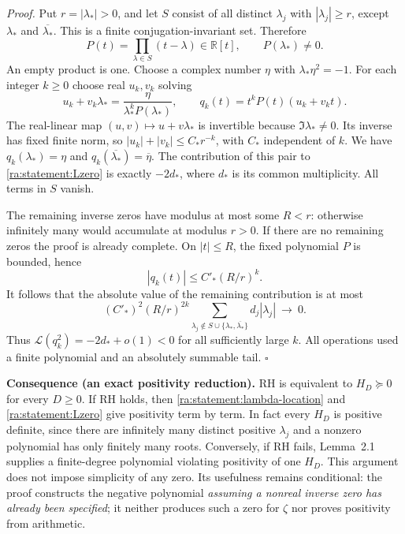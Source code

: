 \documentclass[11pt]{article}
\newcommand{\R}{\mathbb{R}}
\begin{document}
\textit{Proof.}
Put $r=|\lambda_*|>0$, and let $S$ consist of all distinct $\lambda_j$
with $|\lambda_j|\ge r$, except $\lambda_*$ and $\overline{\lambda_*}$.
This is a finite conjugation-invariant set. Therefore
\[
 P(t)=\prod_{\lambda\in S}(t-\lambda)\in\R[t],
 \qquad P(\lambda_*)\ne0.
\]
An empty product is one. Choose a complex number $\eta$ with
$\lambda_*\eta^2=-1$. For each integer $k\ge0$ choose real $u_k,v_k$ solving
\[
 u_k+v_k\lambda_*
       =\frac{\eta}{\lambda_*^kP(\lambda_*)},
 \qquad q_k(t)=t^kP(t)(u_k+v_kt).
\]
The real-linear map $(u,v)\mapsto u+v\lambda_*$ is invertible because
$\Im\lambda_*\ne0$. Its inverse has fixed finite norm, so
$|u_k|+|v_k|\le C_*r^{-k}$, with $C_*$ independent of $k$.
We have $q_k(\lambda_*)=\eta$ and
$q_k(\overline{\lambda_*})=\overline\eta$. The contribution of this pair
to \eqref{ra:statement:Lzero} is exactly $-2d_*$, where $d_*$ is its common
multiplicity. All terms in $S$ vanish.

The remaining inverse zeros have modulus at most some $R<r$: otherwise
infinitely many would accumulate at modulus $r>0$. If there are no remaining
zeros the proof is already complete. On $|t|\le R$, the fixed polynomial
$P$ is bounded, hence
\[
 |q_k(t)|\le C'_* (R/r)^k.
\]
It follows that the absolute value of the remaining contribution is at most
\begin{equation}\label{ra:statement:filter-tail}
 (C'_*)^2(R/r)^{2k}\sum_{\lambda_j\notin S\cup\{\lambda_*,\overline{\lambda_*}\}}
                  d_j|\lambda_j|\ \longrightarrow\ 0.
\end{equation}
Thus $\mathcal L(q_k^2)=-2d_*+o(1)<0$ for all sufficiently large $k$.
All operations used a finite polynomial and an absolutely summable tail.
\hfill$\square$

\medskip
\textbf{Consequence (an exact positivity reduction).}
RH is equivalent to $H_D\succeq0$ for every $D\ge0$. If RH holds, then
\eqref{ra:statement:lambda-location} and \eqref{ra:statement:Lzero} give positivity
term by term. In fact every $H_D$ is positive definite, since there are
infinitely many distinct positive $\lambda_j$ and a nonzero polynomial has
only finitely many roots. Conversely, if RH fails, Lemma~2.1 supplies a
finite-degree polynomial violating positivity of one $H_D$. This argument
does not impose simplicity of any zero. Its usefulness remains conditional:
the proof constructs the negative polynomial \emph{assuming a nonreal
inverse zero has already been specified}; it neither produces such a zero
for $\zeta$ nor proves positivity from arithmetic.
\end{document}
